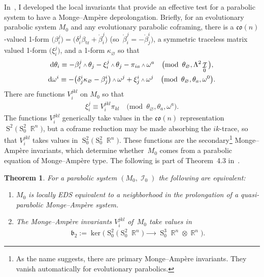 \documentclass[pdftex]{sigma}
\DeclareMathOperator{\R}{\mathbb{R}}
\DeclareMathOperator{\Sym}{S}
\DeclareMathOperator{\tr}{tr}
\DeclareMathOperator{\I}{\mathcal{I}}
\renewcommand{\d}{{\rm d}}
\renewcommand{\mod}[1]{\quad\big(\mathrm{mod\enspace} #1\big)}
\newcommand{\w}{{\mathchoice{\,{\scriptstyle\wedge}\,}{{\scriptstyle\wedge}}
 {{\scriptscriptstyle\wedge}}{{\scriptscriptstyle\wedge}}}}
\newcommand{\thetas}[1]{\theta_{#1}}
\newcommand{\pis}[1]{\pi_{#1}}
\numberwithin{equation}{section}
\newtheorem{Theorem}{Theorem}[section]
\begin{document}
In~\cite{McMillan:ParabolicsI}, I developed the local invariants that provide an effective test for a parabolic system to have a Monge--Amp\`ere deprolongation. Briefly, for an evolutionary parabolic system $M_0$ and any evolutionary parabolic coframing, there is a $\mathfrak{co}(n)$-valued 1-form $\big(\beta_i^j\big) = \big(\delta_i^j\beta_{\tr} + \mathring{\beta}_i^j\big)$ (so~$\mathring{\beta}_i^j = -\mathring{\beta}_j^i)$, a symmetric traceless matrix valued 1-form $\big(\xi_i^j\big)$, and a 1-form $\kappa_{\varnothing}$ so that
\begin{gather}
 \d\thetas{i} \equiv - \beta_i^j\w\thetas{j} - \xi^j_i\w\thetas{j} - \pis{ia}\w\omega^a \mod{\thetas{\varnothing},\Lambda^2 \I_0}, \nonumber
 \\
 \d\omega^i \equiv -\big(\delta^i_j \kappa_{\varnothing} - \beta^i_j\big)\w\omega^j + \xi^i_j\w\omega^j \mod{\thetas{\varnothing}, \thetas{a}, \omega^0} .\label{eq: evolutionary MA structure equations}
\end{gather}
There are functions $V^{jkl}_i$ on $M_0$ so that
\begin{gather*}
\xi_i^j \equiv V_i^{jkl}\pis{kl} \mod{\thetas{\varnothing}, \thetas{a}, \omega^a } .
\end{gather*}
The functions $V_i^{jkl}$ generically take values in the $\mathfrak{co}(n)$ representation $\Sym^2 \big(\Sym^2_0 \R^n\big)$, but a coframe reduction may be made absorbing the $ik$-trace, so that $V_i^{jkl}$ takes values in $\Sym^2_0 \big(\Sym^2_0 \R^n\big)$. These functions are the secondary\footnote{As the name suggests, there are primary Monge--Amp\`ere invariants. They vanish automatically for evolutionary parabolics.} Monge--Amp\`ere invariants, which determine whether~$M_0$ comes from a parabolic equation of Monge--Amp\`ere type. The following is part of Theorem~4.3 in~\cite{McMillan:ParabolicsI}.
\begin{Theorem}
 For a parabolic system $(M_0,\I_0)$ the following are equivalent:
 \begin{enumerate}\itemsep=0pt
 \item[$1.$] $M_0$ is locally EDS equivalent to a neighborhood in the prolongation of a quasi-parabolic Monge--Amp\`ere system.

 \item[$2.$] The Monge--Amp\`ere invariants $V_i^{jkl}$ of~$M_0$ take values in
 \begin{gather*}
 \mathfrak{b}_2 := \ker\big(\Sym^2_0 \big( \Sym^2_0 \R^n\big) \xrightarrow{\qquad} \Sym_0^3 \R^n \otimes \R^n\big).
 \end{gather*}
 \end{enumerate}
\end{Theorem}
\end{document}
